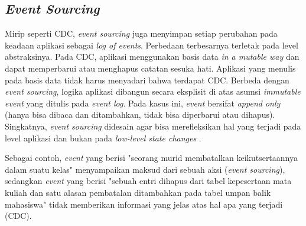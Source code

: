 \subsection{\textit{Event Sourcing}}

Mirip seperti CDC, \textit{event sourcing} juga menyimpan setiap perubahan pada keadaan aplikasi sebagai \textit{log of events}. Perbedaan terbesarnya terletak pada level abstraksinya. Pada CDC, aplikasi menggunakan basis data \textit{in a mutable way} dan dapat memperbarui atau menghapus catatan sesuka hati. Aplikasi yang menulis pada basis data tidak harus menyadari bahwa terdapat CDC. Berbeda dengan \textit{event sourcing}, logika aplikasi dibangun secara eksplisit di atas asumsi \textit{immutable event} yang ditulis pada \textit{event log}. Pada kasus ini, \textit{event} bersifat \textit{append only} (hanya bisa dibaca dan ditambahkan, tidak bisa diperbarui atau dihapus). Singkatnya, \textit{event sourcing} didesain agar bisa merefleksikan hal yang terjadi pada level aplikasi dan bukan pada \textit{low-level state changes} \parencite{dataIntensiveApplications}.

Sebagai contoh, \textit{event} yang berisi "seorang murid membatalkan keikutsertaannya dalam suatu kelas" menyampaikan maksud dari sebuah aksi (\textit{event sourcing}), sedangkan \textit{event} yang berisi "sebuah entri dihapus dari tabel kepesertaan mata kuliah dan satu alasan pembatalan ditambahkan pada tabel umpan balik mahasiswa" tidak memberikan informasi yang jelas atas hal apa yang terjadi (CDC).